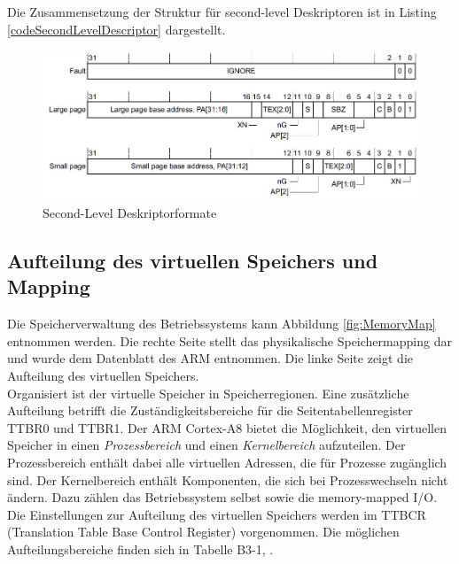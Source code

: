 Die Zusammensetzung der Struktur für second-level Deskriptoren ist in Listing \ref{codeSecondLevelDescriptor} dargestellt.\\

\begin{figure}[H]
	\includegraphics[scale=0.7]{chapters/mmu/figures/secondLevelDescriptor}
	\caption{Second-Level Deskriptorformate \cite[S. B3-1327]{ARM:ARM}}
	\label{fig:secondLevelDescriptor}
\end{figure}





\subsection{Aufteilung des virtuellen Speichers und Mapping}
\label{subsect:memoryMapping}

Die Speicherverwaltung des Betriebssystems kann Abbildung \ref{fig:MemoryMap} entnommen werden. Die rechte Seite stellt das physikalische Speichermapping dar und wurde dem Datenblatt des ARM \cite[S. 155]{ARM:TRM} entnommen. Die linke Seite zeigt die Aufteilung des virtuellen Speichers.\\

Organisiert ist der virtuelle Speicher in Speicherregionen. Eine zusätzliche Aufteilung betrifft die Zuständigkeitsbereiche für die Seitentabellenregister TTBR0 und TTBR1. Der ARM Cortex-A8 bietet die Möglichkeit, den virtuellen Speicher in einen \emph{Prozessbereich} und einen \emph{Kernelbereich} aufzuteilen. Der Prozessbereich enthält dabei alle virtuellen Adressen, die für Prozesse zugänglich sind. Der Kernelbereich enthält Komponenten, die sich bei Prozesswechseln nicht ändern. Dazu zählen das Betriebssystem selbst sowie die memory-mapped I/O. \\ 

Die Einstellungen zur Aufteilung des virtuellen Speichers werden im  TTBCR (Translation Table Base Control Register) vorgenommen. Die möglichen Aufteilungsbereiche finden sich in Tabelle B3-1, \cite[S. B3-1330]{ARM:ARM}.\\

